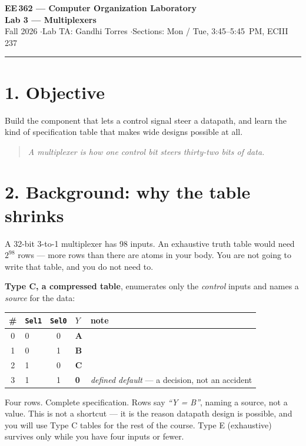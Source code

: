\documentclass[11pt]{article}
\newcommand{\code}[1]{\texttt{#1}}
\newcommand{\hr}{\vspace{2pt}\hrule\vspace{6pt}}
\begin{document}
\begin{center}
{\Large\bfseries EE\,362 --- Computer Organization Laboratory}\\[2pt]
{\large\bfseries Lab 3 --- Multiplexers}\\[4pt]
Fall 2026 \quad$\cdot$\quad Lab TA: Gandhi Torres \quad$\cdot$\quad Sections: Mon / Tue, 3:45--5:45~PM, ECIII 237
\end{center}
\hr

\section*{1. Objective}

Build the component that lets a control signal steer a datapath, and learn the
kind of specification table that makes wide designs possible at all.

\begin{quote}
\emph{A multiplexer is how one control bit steers thirty-two bits of data.}
\end{quote}

\section*{2. Background: why the table shrinks}

A 32-bit 3-to-1 multiplexer has 98 inputs. An exhaustive truth table would need
$2^{98}$ rows --- more rows than there are atoms in your body. You are not going
to write that table, and you do not need to.

\textbf{Type C, a compressed table}, enumerates only the \emph{control} inputs and
names a \emph{source} for the data:

\begin{center}
\begin{tabular}{clc@{\hskip 8pt}||@{\hskip 8pt}ll}
\toprule
\# & \code{Sel1} & \code{Sel0} & $Y$ & note \\
\midrule
0 & 0 & 0 & \textbf{A} & \\
1 & 0 & 1 & \textbf{B} & \\
2 & 1 & 0 & \textbf{C} & \\
3 & 1 & 1 & \textbf{0} & \emph{defined default} --- a decision, not an accident \\
\bottomrule
\end{tabular}
\end{center}

Four rows. Complete specification. Rows say \emph{``Y = B''}, naming a source, not
a value. This is not a shortcut --- it is the reason datapath design is possible,
and you will use Type C tables for the rest of the course. Type E (exhaustive)
survives only while you have four inputs or fewer.
\end{document}
